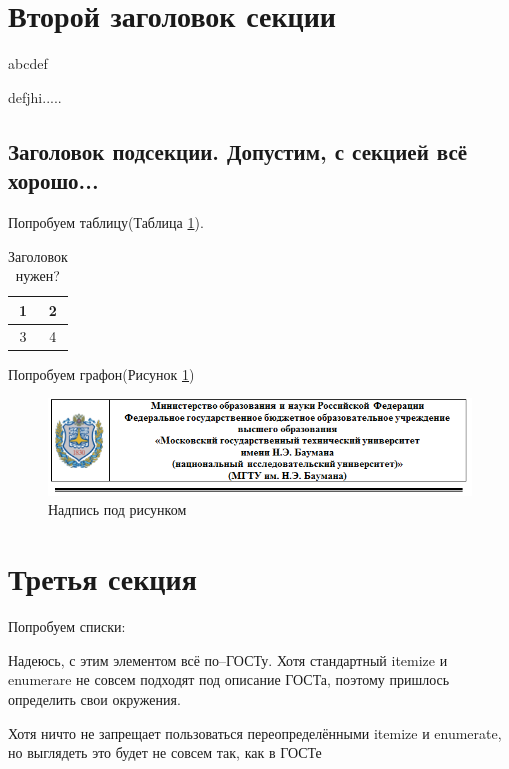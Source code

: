 \documentclass{article}
\begin{document}
\section{Второй заголовок секции}

abcdef 

defjhi.....

\subsection{Заголовок подсекции. Допустим, с секцией всё хорошо...}

Попробуем таблицу(Таблица \ref{tablekey}).

\begin{table}[h!]
\caption{Заголовок нужен?}
	\begin{center}
		\begin{tabular}{|c|c|}
			\hline 
			1 & 2 \\ 
			\hline 
			3 & 4 \\ 
			\hline 
		\end{tabular} 
	\end{center}
\label{tablekey}
\end{table}

Попробуем графон(Рисунок \ref{fig:fortitle})

\begin{figure}[h!]
	\centering
	\includegraphics[width=0.7\linewidth]{For_title}
	\caption{Надпись под рисунком}
	\label{fig:fortitle}
\end{figure}

\section{Третья секция}

Попробуем списки:

\begin{GostItemize}
\item Надеюсь, с этим элементом всё по--ГОСТу. Хотя стандартный itemize и enumerare не совсем подходят под описание ГОСТа, поэтому пришлось определить свои окружения.

\item Хотя ничто не запрещает пользоваться переопределёнными itemize и enumerate, но выглядеть это будет не совсем так, как в ГОСТе
\end{GostItemize}
\end{document}
